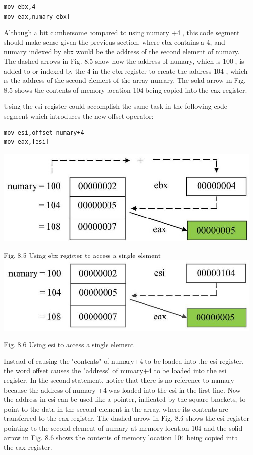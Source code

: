 \documentclass[10pt]{article}
\begin{document}
\begin{verbatim}
mov ebx,4
mov eax,numary[ebx]
\end{verbatim}

Although a bit cumbersome compared to using numary +4 , this code segment should make sense given the previous section, where ebx contains a 4, and numary indexed by ebx would be the address of the second element of numary. The dashed arrows in Fig. 8.5 show how the address of numary, which is 100 , is added to or indexed by the 4 in the ebx register to create the address 104 , which is the address of the second element of the array numary. The solid arrow in Fig. 8.5 shows the contents of memory location 104 being copied into the eax register.

Using the esi register could accomplish the same task in the following code segment which introduces the new offset operator:

\begin{verbatim}
mov esi,offset numary+4
mov eax,[esi]
\end{verbatim}

\begin{center}
\includegraphics[max width=\textwidth]{2025_03_24_ebe50cc223a6fbc49eecg-180}
\end{center}

Fig. 8.5 Using ebx register to access a single element\\
\includegraphics[max width=\textwidth, center]{2025_03_24_ebe50cc223a6fbc49eecg-181}

Fig. 8.6 Using esi to access a single element

Instead of causing the "contents" of numary+4 to be loaded into the esi register, the word offset causes the "address" of numary+4 to be loaded into the esi register. In the second statement, notice that there is no reference to numary because the address of numary +4 was loaded into the esi in the first line. Now the address in esi can be used like a pointer, indicated by the square brackets, to point to the data in the second element in the array, where its contents are transferred to the eax register. The dashed arrow in Fig. 8.6 shows the esi register pointing to the second element of numary at memory location 104 and the solid arrow in Fig. 8.6 shows the contents of memory location 104 being copied into the eax register.
\end{document}
